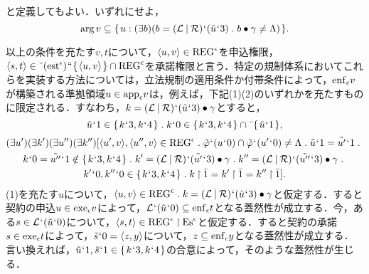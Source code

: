 と定義してもよい．いずれにせよ，
\[
   \arg v \subseteq \classab{u:(\exists b)(
    b = (\mathcal{L}\resl\mathcal{R})\fap(\tilde{u}\fap 3)\con{1}
    b\bullet\gamma\neq \Lambda
   )}.
\]

以上の条件を充たす$v,t$について，$ \langle u,v \rangle\in\mathrm{REG}^\epsilon $を申込権限，$ \langle s,t \rangle\in \breve{\:\:}(\mathrm{est}^\epsilon){\mspace{1mu}{``}\mspace{1mu}}\{\mspace{2mu}\langle u,v \rangle\mspace{2mu}\}\cap\mathrm{REG}^\epsilon $を承諾権限と言う．特定の規制体系においてこれらを実装する方法については，立法規制の適用条件か付帯条件によって，$\mathrm{enf}_{\epsilon}v$が構築される準拠領域$u\in\mathrm{app}_{\epsilon} v$は，例えば，下記(1)(2)のいずれかを充たすものに限定される．すなわち，$ k = (\mathcal{L}\mathbin{\mid}\mathcal{R}){\mspace{1mu}{`}\mspace{1mu}}(\tilde{u}{\mspace{1mu}{`}\mspace{1mu}} 3)\bullet\gamma $とすると，
\setcounter{equation}{0}
\begin{equation}
    \tilde{u}\fap 1\in\classab{k\fap 3,k\fap 4}\con{1}k\fap 0\in\classab{k\fap 3,k\fap 4}\cap\barl{\classab{\tilde{u}\fap 1}},
\end{equation}
\begin{multline}
    (\exists u')(\exists k')(\exists u'')(\exists k'')[
        \orp{u',v},\orp{u'',v}\in\mathrm{REG}^\epsilon\con{1}
        \check{\varphi}\fap(u\fap 0)\cap\check{\varphi}\fap(u'\fap 0)\neq\Lambda\con{1}
        \tilde{u}\fap 1 = \tilde{u'}\fap 1 \con{1}\\
        k\fap 0 = \tilde{u''}\fap 1\notin\classab{k\fap 3,k\fap4}\con{1}
        k' = (\mathcal{L}\resl\mathcal{R})\fap(\tilde{u'}\fap 3)\bullet\gamma\con{1}k'' = (\mathcal{L}\resl\mathcal{R})\fap(\tilde{u''}\fap 3)\bullet\gamma\con{1}\\
        k'\fap 0 ,k''\fap 0 \in \classab{k\fap 3,k\fap4}\con{1}
        k\uphr\bar{1} = k'\uphr \bar{1} = k''\uphr\bar{1}
    ].
\end{multline}
(1)を充たす$u$について，$ \orp{u,v}\in\mathrm{REG}^\epsilon\con{1}k = (\mathcal{L}\resl\mathcal{R})\fap(\tilde{u}\fap 3)\bullet\gamma $と仮定する．すると契約の申込$ u\in \mathrm{exe}_{\epsilon} v $によって，$ \mathcal{L}{\mspace{1mu}{`}\mspace{1mu}}(\tilde{u}{\mspace{1mu}{`}\mspace{1mu}} 0)\subseteq\mathrm{enf}_{\epsilon}t $となる蓋然性が成立する．今，ある$ s\in\mathcal{L}{\mspace{1mu}{`}\mspace{1mu}}(\tilde{u}{\mspace{1mu}{`}\mspace{1mu}} 0) $について，$ \langle s,t \rangle\in\mathrm{REG}^\epsilon\mathbin{\upharpoonright}\mathrm{Es}^\epsilon $と仮定する．すると契約の承諾$ s\in\mathrm{exe}_{\epsilon} t $によって，$ \tilde{s}{\mspace{1mu}{`}\mspace{1mu}} 0 = \langle z,y \rangle $について，$z\subseteq \mathrm{enf}_{\epsilon}y$となる蓋然性が成立する．
言い換えれば，$ \tilde{u}{\mspace{1mu}{`}\mspace{1mu}} 1,\tilde{s}{\mspace{1mu}{`}\mspace{1mu}} 1\in \{\mspace{2mu}k{\mspace{1mu}{`}\mspace{1mu}} 3,k{\mspace{1mu}{`}\mspace{1mu}} 4\mspace{2mu}\} $の合意によって，そのような蓋然性が生じる．

